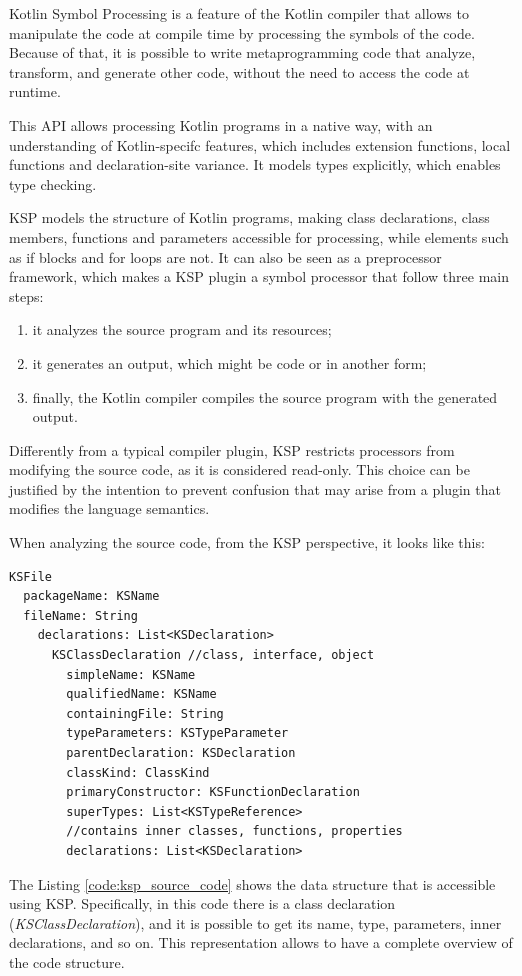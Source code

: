 Kotlin Symbol Processing is a feature of the Kotlin compiler that allows to manipulate the code at compile time by processing the symbols of the code. Because of that, it is possible to write metaprogramming code that analyze, transform, and generate other code, without the need to access the code at runtime.

This API allows processing Kotlin programs in a native way, with an understanding of Kotlin-specifc features, which includes extension functions, local functions and declaration-site variance. It models types explicitly, which enables type checking.

KSP models the structure of Kotlin programs, making class declarations, class members, functions and parameters accessible for processing, while elements such as if blocks and for loops are not.\newline
It can also be seen as a preprocessor framework, which makes a KSP plugin a symbol processor that follow three main steps:
\begin{enumerate}
    \item it analyzes the source program and its resources;
    \item it generates an output, which might be code or in another form;
    \item finally, the Kotlin compiler compiles the source program with the generated output.
\end{enumerate}

Differently from a typical compiler plugin, KSP restricts processors from modifying the source code, as it is considered read-only. This choice can be justified by the intention to prevent confusion that may arise from a plugin that modifies the language semantics.

When analyzing the source code, from the KSP perspective, it looks like this:
\begin{lstlisting}[caption={The source code from KSP perspective \cite{ksp_documentation}}, captionpos=b, label={code:ksp_source_code}]
KSFile
  packageName: KSName
  fileName: String
    declarations: List<KSDeclaration>
      KSClassDeclaration //class, interface, object
        simpleName: KSName
        qualifiedName: KSName
        containingFile: String
        typeParameters: KSTypeParameter
        parentDeclaration: KSDeclaration
        classKind: ClassKind
        primaryConstructor: KSFunctionDeclaration
        superTypes: List<KSTypeReference>
        //contains inner classes, functions, properties
        declarations: List<KSDeclaration>    
\end{lstlisting}
The Listing \ref{code:ksp_source_code} shows the data structure that is accessible using KSP. Specifically, in this code there is a class declaration (\textit{KSClassDeclaration}), and it is possible to get its name, type, parameters, inner declarations, and so on.\newline
This representation allows to have a complete overview of the code structure.

